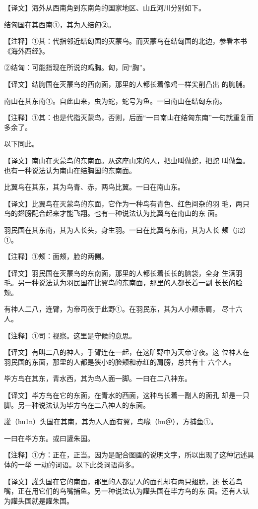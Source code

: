 \documentclass[a4paper,12pt,UTF8,twoside]{ctexbook}
\begin{document}
【译文】海外从西南角到东南角的国家地区、山丘河川分别如下。

结匈国在其西南①，其为人结匈②。

【注释】①其：代指邻近结匈国的灭蒙鸟。而灭蒙鸟在结匈国的北边，参看本书《海外西经》。

②结匈：可能指现在所说的鸡胸。匈，同“胸”。

【译文】结胸国在灭蒙鸟的西南面，那里的人都长着像鸡一样尖削凸出 的胸脯。

南山在其东南①。自此山来，虫为蛇，蛇号为鱼。一曰南山在结匈东南。

【注释】①其：也是代指灭蒙鸟，否则，后面“一曰南山在结匈东南”一句就重复而多余了。

以下同此。

【译文】南山在灭蒙鸟的东南面。从这座山来的人，把虫叫做蛇，把蛇 叫做鱼。也有一种说法认为南山在结胸国的东南面。

比翼鸟在其东，其为鸟青、赤，两鸟比翼。一曰在南山东。

【译文】比翼鸟在灭蒙鸟的东面，它作为一种鸟有青色、红色间杂的羽 毛，两只鸟的翅膀配合起来才能飞翔。也有一种说法认为比翼鸟在南山的东 面。

羽民国在其东南，其为人长头，身生羽。一曰在比翼鸟东南，其为人长 颊（ji2）①。

【注释】①颊：面颊，脸的两侧。

【译文】羽民国在灭蒙鸟的东南面，那里的人都长着长长的脑袋，全身 生满羽毛。另一种说法认为羽民国在比翼鸟的东南面，那里的人都长着一副 长长的脸颊。

有神人二八，连臂，为帝司夜于此野①。在羽民东，其为人小颊赤肩， 尽十六人。

【注释】①司：视察。这里是守候的意思。

【译文】有叫二八的神人，手臂连在一起，在这旷野中为天帝守夜。这 位神人在羽民国的东面，那里的人都是狭小的脸颊和赤红的肩膀，总共有十 六个人。

毕方鸟在其东，青水西，其为鸟人面一脚。一曰在二八神东。

【译文】毕方鸟在它的东面，在青水的西面，这种鸟长着一副人的面孔 却是一只脚。另一种说法认为毕方鸟在二八神人的东面。

讙（hu1n）头国在其南，其为人人面有翼，鸟喙（hu＠），方捕鱼①。

一曰在毕方东。或曰讙朱国。

【注释】①方：正在，正当。因为是配合图画的说明文字，所以出现了这种记述具体的一举 一动的词语。以下此类词语尚多。

【译文】讙头国在它的南面，那里的人都是人的面孔却有两只翅膀，还 长着鸟嘴，正在用它们的鸟嘴捕鱼。另一种说法认为讙头国在毕方鸟的东 面。还有人认为讙头国就是讙朱国。
\end{document}
